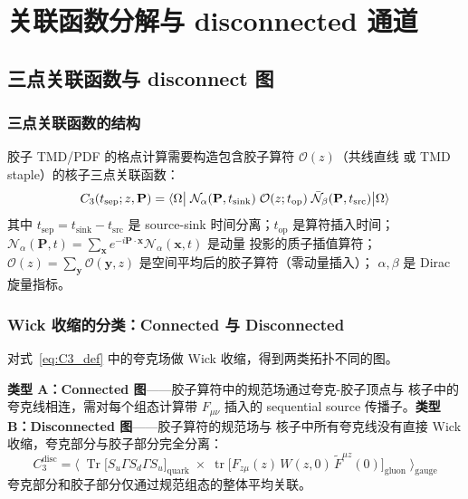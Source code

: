 \documentclass[11pt,a4paper]{ctexart}
\newcommand{\tr}{\operatorname{Tr}}
\newcommand{\trc}{\operatorname{tr}}
\begin{document}
\section{关联函数分解与 disconnected 通道}
\label{sec:factorization}

\subsection{三点关联函数与 disconnect 图}

\subsubsection{三点关联函数的结构}

胶子 TMD/PDF 的格点计算需要构造包含胶子算符 $\mathcal{O}(z)$（共线直线
或 TMD staple）的核子三点关联函数：
\begin{equation}\label{eq:C3_def}
C_3(t_{\text{sep}}; z, \mathbf{P}) =
\braket{\Omega \big|
\;\mathcal{N}_\alpha(\mathbf{P}, t_{\text{sink}}) \;
\mathcal{O}(z; t_{\text{op}}) \;
\bar{\mathcal{N}}_\beta(\mathbf{P}, t_{\text{src}})
\big| \Omega}
\end{equation}
其中 $t_{\text{sep}} = t_{\text{sink}} - t_{\text{src}}$ 是 source-sink
时间分离；$t_{\text{op}}$ 是算符插入时间；
$\mathcal{N}_\alpha(\mathbf{P}, t) = \sum_{\mathbf{x}}
e^{-i\mathbf{P}\cdot\mathbf{x}} \mathcal{N}_\alpha(\mathbf{x}, t)$ 是动量
投影的质子插值算符；$\mathcal{O}(z) = \sum_{\mathbf{y}}
\mathcal{O}(\mathbf{y}, z)$ 是空间平均后的胶子算符（零动量插入）；
$\alpha,\beta$ 是 Dirac 旋量指标。

\subsubsection{Wick 收缩的分类：Connected 与 Disconnected}

对式~\eqref{eq:C3_def} 中的夸克场做 Wick 收缩，得到两类拓扑不同的图。

\textbf{类型 A：Connected 图}——胶子算符中的规范场通过夸克-胶子顶点与
核子中的夸克线相连，需对每个组态计算带 $F_{\mu\nu}$ 插入的 sequential
source 传播子。\textbf{类型 B：Disconnected 图}——胶子算符的规范场与
核子中所有夸克线没有直接 Wick 收缩，夸克部分与胶子部分完全分离：
\begin{equation}\label{eq:disconnected}
C_3^{\text{disc}} = \big\langle\;
\tr\big[ S_u \Gamma S_d \Gamma S_u \big]_{\text{quark}}
\;\times\;
\trc\big[ F_{z\mu}(z) \, W(z,0) \, \tilde{F}^{\mu z}(0) \big]_{\text{gluon}}
\;\big\rangle_{\text{gauge}}
\end{equation}
夸克部分和胶子部分仅通过规范组态的整体平均关联。
\end{document}
